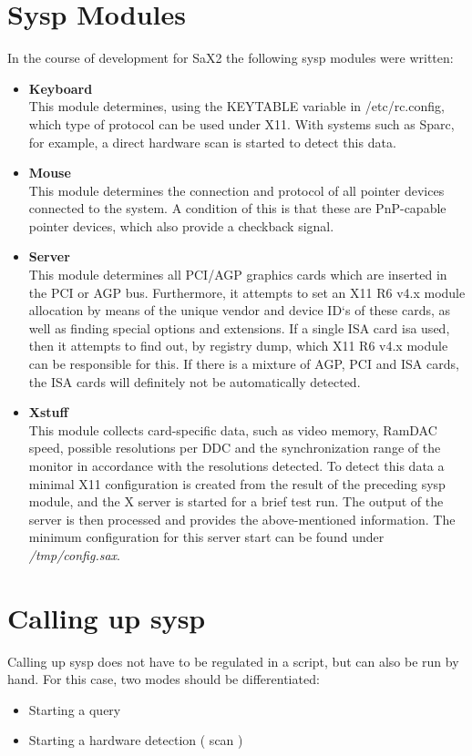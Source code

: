 \section{Sysp Modules}
In the course of development for SaX2 the following sysp modules were written:
\begin{itemize}
\item \textbf{Keyboard}\\
      This module determines, using the KEYTABLE variable in 
      /etc/rc.config, which type of protocol can be used under X11. With
      systems such as Sparc, for example, a direct hardware scan is started to
      detect this data. 
\item \textbf{Mouse}\\
      This module determines the connection and protocol of all pointer
      devices connected to the system. A condition of this is that these are
      PnP-capable pointer devices, which also provide a checkback signal.
\item \textbf{Server}\\
      This module determines all PCI/AGP graphics cards which are inserted in
      the PCI or AGP bus. Furthermore, it attempts to set an X11 R6 v4.x
      module allocation by means of the unique vendor and device ID`s of these
      cards, as well as finding special options and extensions. If a single
      ISA card isa used, then it attempts to find out, by registry dump, which
      X11 R6 v4.x module can be responsible for this. If there is a mixture of
      AGP, PCI and ISA cards, the ISA cards will definitely not be
      automatically detected.
\item \textbf{Xstuff}\\
      This module collects card-specific data, such as video memory, RamDAC
      speed, possible resolutions per DDC and the synchronization range of the
      monitor in accordance with the resolutions detected. To detect this data
      a minimal X11 configuration is created from the result of the
      preceding sysp module, and the X server is started for a brief test
      run. The output of the server is then processed and provides the
      above-mentioned information. The minimum configuration for this server
      start can be found under \textit{/tmp/config.sax}.
\end{itemize}


\section{Calling up sysp}
Calling up sysp does not have to be regulated in a script, but can also be run
by hand. For this case, two modes should be differentiated:
\begin{itemize}
\item Starting a query
\item Starting a hardware detection ( scan )
\end{itemize}
